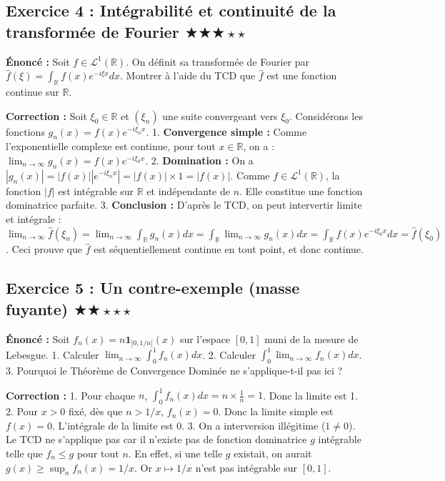 \documentclass[11pt,a4paper]{article}
\begin{document}
\subsection*{{Exercice 4 : Intégrabilité et continuité de la transformée de Fourier \quad $\bigstar\bigstar\bigstar\star\star$}}

\textbf{Énoncé :}
Soit $f \in \mathcal{L}^1(\mathbb{R})$. On définit sa transformée de Fourier par $\hat{f}(\xi) = \int_{\mathbb{R}} f(x) e^{-i \xi x} dx$.
Montrer à l'aide du TCD que $\hat{f}$ est une fonction continue sur $\mathbb{R}$.

\textbf{Correction :}
Soit $\xi_0 \in \mathbb{R}$ et $(\xi_n)$ une suite convergeant vers $\xi_0$.
Considérons les fonctions $g_n(x) = f(x) e^{-i \xi_n x}$.
1. \textbf{Convergence simple :} Comme l'exponentielle complexe est continue, pour tout $x \in \mathbb{R}$, on a :
   $\lim_{n \to \infty} g_n(x) = f(x) e^{-i \xi_0 x}$.
2. \textbf{Domination :} On a $|g_n(x)| = |f(x)| |e^{-i \xi_n x}| = |f(x)| \times 1 = |f(x)|$.
   Comme $f \in \mathcal{L}^1(\mathbb{R})$, la fonction $|f|$ est intégrable sur $\mathbb{R}$ et indépendante de $n$. Elle constitue une fonction dominatrice parfaite.
3. \textbf{Conclusion :} D'après le TCD, on peut intervertir limite et intégrale :
   $\lim_{n \to \infty} \hat{f}(\xi_n) = \lim_{n \to \infty} \int_{\mathbb{R}} g_n(x) dx = \int_{\mathbb{R}} \lim_{n \to \infty} g_n(x) dx = \int_{\mathbb{R}} f(x) e^{-i \xi_0 x} dx = \hat{f}(\xi_0)$.
   Ceci prouve que $\hat{f}$ est séquentiellement continue en tout point, et donc continue.


\subsection*{{Exercice 5 : Un contre-exemple (masse fuyante) \quad $\bigstar\bigstar\star\star\star$}}

\textbf{Énoncé :}
Soit $f_n(x) = n \mathbf{1}_{]0, 1/n[}(x)$ sur l'espace $[0, 1]$ muni de la mesure de Lebesgue.
1. Calculer $\lim_{n \to \infty} \int_0^1 f_n(x) dx$.
2. Calculer $\int_0^1 \lim_{n \to \infty} f_n(x) dx$.
3. Pourquoi le Théorème de Convergence Dominée ne s'applique-t-il pas ici ?

\textbf{Correction :}
1. Pour chaque $n$, $\int_0^1 f_n(x) dx = n \times \frac{1}{n} = 1$. Donc la limite est 1.
2. Pour $x > 0$ fixé, dès que $n > 1/x$, $f_n(x) = 0$. Donc la limite simple est $f(x) = 0$. L'intégrale de la limite est 0.
3. On a interversion illégitime ($1 \neq 0$). Le TCD ne s'applique pas car il n'existe pas de fonction dominatrice $g$ intégrable telle que $f_n \le g$ pour tout $n$.
En effet, si une telle $g$ existait, on aurait $g(x) \ge \sup_n f_n(x) = 1/x$. Or $x \mapsto 1/x$ n'est pas intégrable sur $[0, 1]$.
\end{document}
